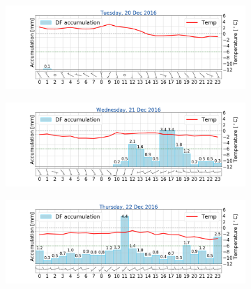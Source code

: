 \begin{figure}[h!]
	\centering
	\begin{subfigure}[b]{0.49\textwidth}
		\includegraphics[trim={4.9cm 1.cm 1.5cm 1cm},clip,
		width=\textwidth]{./fig_weathermast/T_P_U_20161220}
		\caption{}\label{fig:TPU20}
	\end{subfigure}
	\hfill
	\begin{subfigure}[b]{0.49\textwidth}
		\includegraphics[trim={4.9cm 1.cm 1.5cm 1cm},clip,
		width=\textwidth]{./fig_weathermast/T_P_U_20161221}
		\caption{}\label{fig:TPU21}
	\end{subfigure}
	\centering
	\begin{subfigure}[b]{0.49\textwidth}
		\includegraphics[trim={4.9cm 1.cm 1.5cm 1cm},clip,
		width=\textwidth]{./fig_weathermast/T_P_U_20161222}
		\caption{}\label{fig:TPU22}
	\end{subfigure}
	\hfill
	\begin{subfigure}[b]{0.49\textwidth}

\end{subfigure}
\end{figure}
